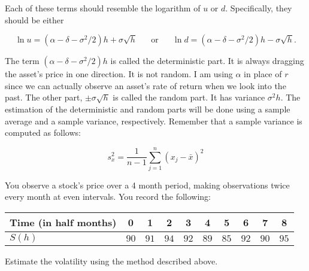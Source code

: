 \documentclass{ximera}
\begin{document}
Each of these terms should resemble the logarithm of $u$ or $d$. Specifically, they should be either 

\begin{equation*}
\ln u=(\alpha-\delta-\sigma^2/2)h+\sigma\sqrt{h} \hspace{20pt}\text{or}\hspace{20pt} \ln d=(\alpha-\delta-\sigma^2/2)h-\sigma\sqrt{h}.
\end{equation*}

The term $(\alpha-\delta-\sigma^2/2)h$ is called the deterministic part. It is always dragging the asset's price in one direction. It is not random. I am using $\alpha$ in place of $r$ since we can actually observe an asset's rate of return when we look into the past. The other part, $\pm\sigma\sqrt{h}$ is called the random part. It has variance $\sigma^2h$. The estimation of the deterministic and random parts will be done using a sample average and a sample variance, respectively. Remember that a sample variance is computed as follows:

\begin{equation*}
s_x^2=\frac{1}{n-1}\sum_{j=1}^n(x_j-\bar{x})^2
\end{equation*}

\begin{example}
You observe a stock's price over a 4 month period, making observations twice every month at even intervals. You record the following:

	\begin{center}
	\begin{tabular}{l|ccccccccc}
	Time (in half months) & 0 & 1 & 2 & 3 & 4 & 5 & 6 & 7 & 8\\
	\hline
	$S(h)$		  & $90$ & $91$ & $94$ & $92$ & $89$ & $85$ & $92$ & $90$ & $95$
	\end{tabular}
	\end{center}

Estimate the volatility using the method described above.
\end{example}
\end{document}
